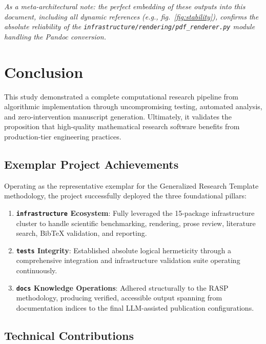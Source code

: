\documentclass[
]{article}
\providecommand{\tightlist}{%
  \setlength{\itemsep}{0pt}\setlength{\parskip}{0pt}}
\begin{document}
\emph{As a meta-architectural note: the perfect embedding of these
outputs into this document, including all dynamic references (e.g.,
fig.~\ref{fig:stability}), confirms the absolute reliability of the
\texttt{infrastructure/rendering/pdf\_renderer.py} module handling the
Pandoc conversion.}

\newpage

\section{Conclusion}\label{sec:conclusion}

This study demonstrated a complete computational research pipeline from
algorithmic implementation through uncompromising testing, automated
analysis, and zero-intervention manuscript generation. Ultimately, it
validates the proposition that high-quality mathematical research
software benefits from production-tier engineering practices.

\subsection{Exemplar Project
Achievements}\label{exemplar-project-achievements}

Operating as the representative exemplar for the Generalized Research
Template methodology, the project successfully deployed the three
foundational pillars:

\begin{enumerate}
\def\labelenumi{\arabic{enumi}.}
\tightlist
\item
  \textbf{\texttt{infrastructure} Ecosystem}: Fully leveraged the
  15-package infrastructure cluster to handle scientific benchmarking,
  rendering, prose review, literature search, BibTeX validation, and
  reporting.
\item
  \textbf{\texttt{tests} Integrity}: Established absolute logical
  hermeticity through a comprehensive integration and infrastructure
  validation suite operating continuously.
\item
  \textbf{\texttt{docs} Knowledge Operations}: Adhered structurally to
  the RASP methodology, producing verified, accessible output spanning
  from documentation indices to the final LLM-assisted publication
  configurations.
\end{enumerate}

\subsection{Technical Contributions}\label{technical-contributions}
\end{document}
